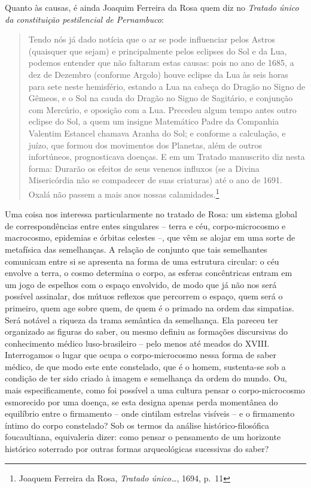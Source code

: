 Quanto às causas, é ainda Joaquim Ferreira da Rosa quem diz no
\emph{Tratado único da constituição pestilencial de Pernambuco}:

\begin{quote}
Tendo nós já dado notícia que o ar se pode influenciar pelos Astros
(quaisquer que sejam) e principalmente pelos eclipses do Sol e da Lua,
podemos entender que não faltaram estas causas: pois no ano de 1685, a
dez de Dezembro (conforme Argolo) houve eclipse da Lua às seis horas
para sete neste hemisfério, estando a Lua na cabeça do Dragão no Signo
de Gêmeos, e o Sol na cauda do Dragão no Signo de Sagitário, e conjunção
com Mercúrio, e oposição com a Lua. Precedeu algum tempo antes outro
eclipse do Sol, a quem um insigne Matemático Padre da Companhia Valentim
Estancel chamava Aranha do Sol; e conforme a calculação, e juízo, que
formou dos movimentos dos Planetas, além de outros infortúneos,
prognosticava doenças. E em um Tratado manuscrito diz nesta forma:
Durarão os efeitos de seus venenos influxos (se a Divina Misericórdia
não se compadecer de suas criaturas) até o ano de 1691. Oxalá não passem
a mais anos nossas calamidades.\footnote{Joaquem Ferreira da Rosa,
  \emph{Tratado único\ldots{}}, 1694, p.~11}
\end{quote}

Uma coisa nos interessa particularmente no tratado de Rosa: um sistema
global de correspondências entre entes singulares -- terra e céu,
corpo-microcosmo e macrocosmo, epidemias e órbitas celestes --, que vêm
se alojar em uma sorte de metafísica das semelhanças. A relação de
conjunto que tais semelhantes comunicam entre si se apresenta na forma
de uma estrutura circular: o céu envolve a terra, o cosmo determina o
corpo, as esferas concêntricas entram em um jogo de espelhos com o
espaço envolvido, de modo que já não nos será possível assinalar, dos
mútuos reflexos que percorrem o espaço, quem será o primeiro, quem age
sobre quem, de quem é o primado na ordem das simpatias. Será notável a
riqueza da trama semântica da semelhança. Ela pareceu ter organizado as
figuras do saber, ou mesmo definiu as formações discursivas do
conhecimento médico luso-brasileiro -- pelo menos até meados do XVIII.
Interrogamos o lugar que ocupa o corpo-microcosmo nessa forma de saber
médico, de que modo este ente constelado, que é o homem, sustenta-se sob
a condição de ter sido criado à imagem e semelhança da ordem do mundo.
Ou, mais especificamente, como foi possível a uma cultura pensar o
corpo-microcosmo esmorecido por uma doença, se esta designa apenas perda
momentânea do equilíbrio entre o firmamento -- onde cintilam estrelas
visíveis -- e o firmamento íntimo do corpo constelado? Sob os termos da
análise histórico-filosófica foucaultiana, equivaleria dizer: como
pensar o pensamento de um horizonte histórico soterrado por outras
formas arqueológicas sucessivas do saber?

